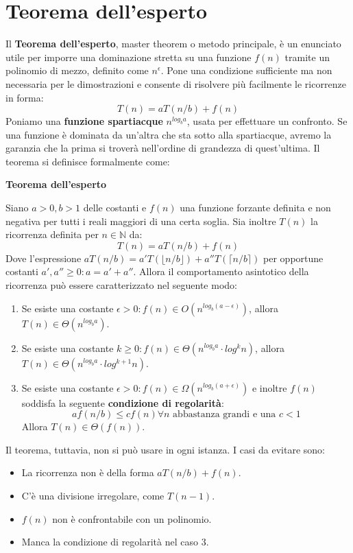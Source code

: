 \section{Teorema dell'esperto}
Il \textbf{Teorema dell'esperto}, master theorem o metodo principale, è un enunciato utile per imporre una dominazione stretta su una funzione $f(n)$ tramite un polinomio di mezzo, definito come $n^{\epsilon}$. Pone una condizione sufficiente ma non necessaria per le dimostrazioni e consente di risolvere più facilmente le ricorrenze in forma: \[T(n) = aT(n/b) + f(n)\]
\noindent Poniamo una \textbf{funzione spartiacque} $n^{log_b a}$, usata per effettuare un confronto. Se una funzione è dominata da un'altra che sta sotto alla spartiacque, avremo la garanzia che la prima si troverà nell'ordine di grandezza di quest'ultima. Il teorema si definisce formalmente come:
\begin{teorema}
	\textbf{Teorema dell'esperto}\par
	\noindent Siano $a>0, b>1$ delle costanti e $f(n)$ una funzione forzante definita e non negativa per tutti i reali maggiori di una certa soglia. Sia inoltre $T(n)$ la ricorrenza definita per $n\in\mathbb{N}$ da: \[T(n) = aT(n/b) + f(n)\]
	\noindent Dove l'espressione $aT(n/b) = a'T(\lfloor n/b\rfloor) + a''T(\lceil n/b\rceil)$ per opportune costanti $a',a''\geq 0 : a = a'+a''$. Allora il comportamento asintotico della ricorrenza può essere caratterizzato nel seguente modo: \begin{enumerate}
		\item Se esiste una costante $\epsilon>0: f(n)\in O(n^{log_b(a-\epsilon)})$, allora $T(n)\in \Theta(n^{log_ba})$.
		\item Se esiste una costante $k \geq 0: f(n) \in \Theta(n^{log_ba}\cdot log^kn)$, allora $T(n) \in \Theta(n^{log_ba}\cdot log^{k+1}n)$.
		\item Se esiste una costante $\epsilon > 0: f(n)\in \Omega(n^{log_b(a+\epsilon)})$ e inoltre $f(n)$ soddisfa la seguente \textbf{condizione di regolarità}: \[af(n/b) \leq cf(n) \forall n \text{ abbastanza grandi e una } c<1\]
		\noindent Allora $T(n) \in \Theta(f(n))$.
	\end{enumerate}
\end{teorema}
\noindent Il teorema, tuttavia, non si può usare in ogni istanza. I casi da evitare sono: \begin{itemize}
	\item La ricorrenza non è della forma $aT(n/b)+f(n)$.
	\item C’è una divisione irregolare, come $T(n-1)$.
	\item $f(n)$ non è confrontabile con un polinomio.
	\item Manca la condizione di regolarità nel caso $3$.
\end{itemize}
